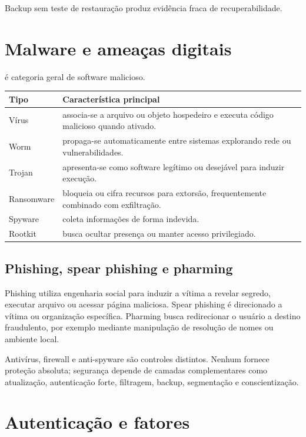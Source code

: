 Backup sem teste de restauração produz evidência fraca de recuperabilidade.

\section{Malware e ameaças digitais}

 é categoria geral de software malicioso.

\begin{table}[ht]
\centering
\small
\begin{tabularx}{\textwidth}{l X}
\toprule
Tipo & Característica principal \\
\midrule
Vírus & associa-se a arquivo ou objeto hospedeiro e executa código malicioso quando ativado. \\
Worm & propaga-se automaticamente entre sistemas explorando rede ou vulnerabilidades. \\
Trojan & apresenta-se como software legítimo ou desejável para induzir execução. \\
Ransomware & bloqueia ou cifra recursos para extorsão, frequentemente combinado com exfiltração. \\
Spyware & coleta informações de forma indevida. \\
Rootkit & busca ocultar presença ou manter acesso privilegiado. \\
\bottomrule
\end{tabularx}
\end{table}

\subsection{Phishing, spear phishing e pharming}

Phishing utiliza engenharia social para induzir a vítima a revelar segredo, executar arquivo ou acessar página maliciosa. Spear phishing é direcionado a vítima ou organização específica. Pharming busca redirecionar o usuário a destino fraudulento, por exemplo mediante manipulação de resolução de nomes ou ambiente local.

Antivírus, firewall e anti-spyware são controles distintos. Nenhum fornece proteção absoluta; segurança depende de camadas complementares como atualização, autenticação forte, filtragem, backup, segmentação e conscientização.

\section{Autenticação e fatores}

